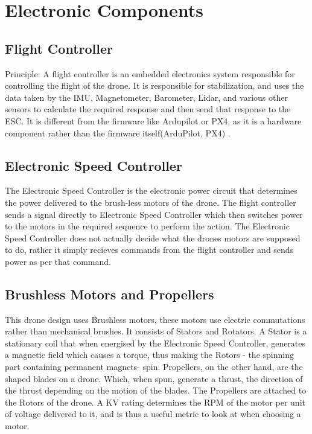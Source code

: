 \documentclass[conference]{IEEEtran}
\begin{document}
\section{Electronic Components}
\subsection{Flight Controller}
Principle: A flight controller is an embedded electronics system responsible for controlling the flight of the drone. It is responsible for stabilization, and uses the data taken by the IMU, Magnetometer, Barometer, Lidar, and various other sensors to calculate the required response and then send that response to the ESC.
 It is different from the firmware like Ardupilot or PX4, as it is a hardware component rather than the firmware itself(ArduPilot, PX4) \cite{ardupilot,px4}.

\subsection{Electronic Speed Controller}
The Electronic Speed Controller is the electronic power circuit that determines the power delivered to the brush-less motors of the drone. The flight controller sends a signal directly to Electronic Speed Controller which then switches power to the motors in the required sequence to perform the action. The Electronic Speed Controller does not actually decide what the drones motors are supposed to do, rather it simply recieves commands from the flight controller and sends power as per that command.


\subsection{Brushless Motors and Propellers}
This drone design uses Brushless motors, these motors use electric commutations rather than mechanical brushes. It consists of Stators and Rotators. A Stator is a stationary coil that when energised by the Electronic Speed Controller, generates a magnetic field which causes a torque, thus making the Rotors - the spinning part containing permanent magnets- spin.
Propellers, on the other hand, are the shaped blades on a drone. Which, when spun, generate a thrust, the direction of the thrust depending on the motion of the blades. The Propellers are attached to the Rotors of the drone.
A KV rating determines the RPM of the motor per unit of voltage delivered to it, and is thus a useful metric to look at when choosing a motor. 
\end{document}
